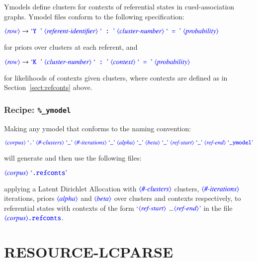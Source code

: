 \documentclass[12pt]{report}
\def\blue{\color{blue}}
\begin{document}
Ymodels define clusters for contexts of referential states in cued-association graphs.
%
Ymodel files conform to the following specification:

$\dtype{row} \rightarrow \dcode{Y\ } \ \dtype{referent-identifier} \ \dcode{\ :\ } \ \dtype{cluster-number} \ \dcode{\ =\ } \ \dtype{probability}$

for priors over clusters at each referent, and

$\dtype{row} \rightarrow \dcode{K\ } \ \dtype{cluster-number} \ \dcode{\ :\ } \ \dtype{context} \ \dcode{\ =\ } \ \dtype{probability}$

for likelihoods of contexts given clusters, where contexts are defined as in Section~\ref{sect:refconts} above.

\subsection{Recipe: {\blue\tt \%\_ymodel}}

Making any ymodel that conforms to the naming convention:

$\dtype{corpus} \ \dcode{.} \ \dtype{\#-clusters} \ \dcode{\_} \ \dtype{\#-iterations} \ \dcode{\_} \ \dtype{alpha} \ \dcode{\_} \ \dtype{beta} \ \dcode{\_} \ \dtype{ref-start} \ \dcode{\_} \ \dtype{ref-end} \ \dcode{\_ymodel}$

will generate and then use the following files:

$\dtype{corpus} \ \dcode{.refconts}$

applying a Latent Dirichlet Allocation with $\dtype{\#-clusters}$ clusters, $\dtype{\#-iterations}$ iterations, priors $\dtype{alpha}$ and $\dtype{beta}$ over clusters and contexts respectively, to referential states with contexts of the form `$\dtype{ref-start}$ \dots $\dtype{ref-end}$' in the file $\dtype{corpus}\text{\blue\tt .refconts}$.




\chapter{RESOURCE-LCPARSE}
\end{document}
